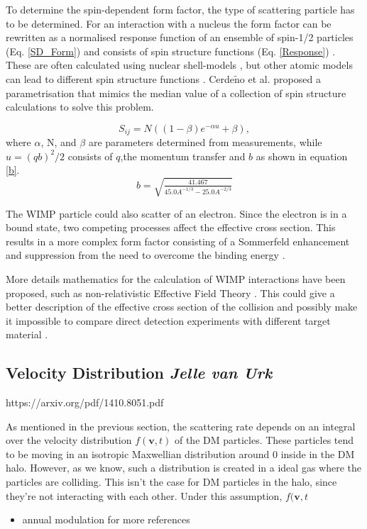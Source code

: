 \documentclass{article}
\begin{document}
To determine the spin-dependent form factor, the type of scattering particle has to be determined. For an interaction with a nucleus the form factor can be rewritten as a normalised response function of an ensemble of spin-1/2 particles (Eq. \ref{SD_Form}) and consists of spin structure functions (Eq. \ref{Response}) \cite{Cannoni:2011iu}. These are often calculated using nuclear shell-models \cite{Ressell:1997kx,Toivanen:2009zza}, but other atomic models can lead to different spin structure functions \cite{Ellis:1987sh, Engel:1989ix, Iachello:1990ut}. Cerde$\tilde{\text{n}}$o et al.\cite{Cerdeno:2012ix} proposed a parametrisation that mimics the median value of a collection of spin structure calculations to solve this problem. 

\begin{equation}
    S_{ij} = N((1-\beta)e^{-\alpha u} + \beta), 
\end{equation}
where $\alpha$, N, and $\beta$ are parameters determined from measurements, while $u = (qb)^2/2$ consists of $q$,the momentum transfer and $b$ as shown in equation \ref{b}.
 \begin{equation} \label{b}
     b = \sqrt{\tfrac{41.467}{45.0A^{-1/3}-25.0A^{-2/3}}}
 \end{equation}

The WIMP particle could also scatter of an electron. Since the electron is in a bound state, two competing processes affect the effective cross section. This results in a more complex form factor consisting of a Sommerfeld enhancement \cite{ArkaniHamed:2008qn} and suppression from the need to overcome the binding energy \cite{Essig:2011nj}.

More details mathematics for the calculation of WIMP interactions have been proposed, such as non-relativistic Effective Field Theory \cite{Fitzpatrick:2012ib}. This could give a better description of the effective cross section of the collision and possibly make it impossible to compare direct detection experiments with different target material \cite{Schneck:2015eqa}. 

\subsection{Velocity Distribution \small{\textit{Jelle van Urk}}} \label{DM_Velocity}
https://arxiv.org/pdf/1410.8051.pdf

As mentioned in the previous section, the scattering rate depends on an integral over the velocity distribution $f(\textbf{v},t)$ of the DM particles. These particles tend to be moving in an isotropic Maxwellian distribution around 0 inside in the DM halo. However, as we know, such a distribution is created in a ideal gas where the particles are colliding. This isn't the case for DM particles in the halo, since they're not interacting with each other. Under this assumption, $f(\textbf{v},t$
\begin{itemize}
    \item annual modulation \cite{Undagoitia:2015gya} for more references
\end{itemize}
\end{document}

